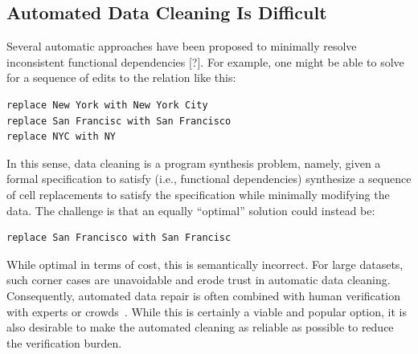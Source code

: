 \subsection{Automated Data Cleaning Is Difficult}
Several automatic approaches have been proposed to minimally resolve inconsistent functional dependencies [?]. For example, one might be able to solve for a sequence of edits to the relation like this:
\begin{lstlisting}
replace New York with New York City
replace San Francisc with San Francisco
replace NYC with NY
\end{lstlisting}
In this sense, data cleaning is a program synthesis problem, namely, given a formal specification to satisfy (i.e., functional dependencies) synthesize a sequence of cell replacements to satisfy the specification while minimally modifying the data.
The challenge is that an equally ``optimal'' solution could instead be:
\begin{lstlisting}
replace San Francisco with San Francisc
\end{lstlisting}
While optimal in terms of cost, this is semantically incorrect. For large datasets, such corner cases are unavoidable and erode trust in automatic data cleaning.
Consequently, automated data repair is often combined with human verification with experts or crowds~\cite{gokhale2014corleone, park2014crowdfill, DBLP:journals/pvldb/YakoutENOI11, chu2015katara, DBLP:journals/pvldb/HaasKWF015,marcus2015crowdsourced}.
While this is certainly a viable and popular option, it is also desirable to make the automated cleaning as reliable as possible to reduce the verification burden.


